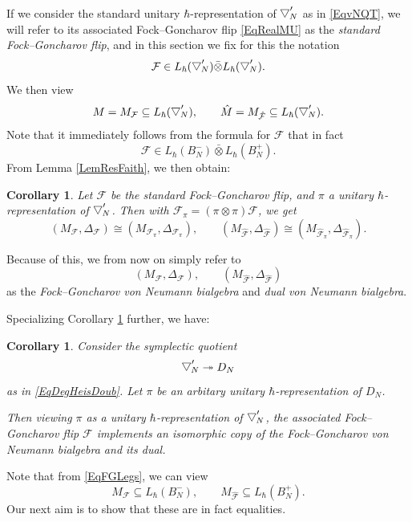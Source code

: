 \documentclass[11pt, reqno]{amsart}
\newtheorem{cor}[theorem]{Corollary}
\theoremstyle{definition}
\numberwithin{equation}{section}
\newcommand{\Fct}{\mathcal{F}}
\newcommand{\Bor}{B}
\newcommand{\wbtd}[1]{\raisebox{\depth}{$\bigtriangledown'$\!\!}_{#1}}
\begin{document}
If we consider the standard unitary $\hbar$-representation of $\wbtd{N}$ as in \eqref{EqvNQT}, we will refer to its associated Fock--Goncharov flip \eqref{EqRealMU} as the \emph{standard Fock--Goncharov flip}, and in this section we fix for this the notation 
\begin{equation}\label{EqStandardFG}
\Fct  \in L_{\hbar}(\wbtd{N}) \bar{\otimes} L_{\hbar}(\wbtd{N}).
\end{equation}
We then view 
\begin{equation}\label{EqvNFG}
M  = M_{\Fct} \subseteq L_{\hbar}(\wbtd{N}),\qquad \hat{M} = M_{\hat{\Fct}} \subseteq L_{\hbar}(\wbtd{N}).
\end{equation}
Note that it immediately follows from the formula for $\Fct$ that in fact 
\begin{equation}\label{EqFGLegs}
\Fct \in L_{\hbar}(\Bor_N^-)\bar{\otimes} L_{\hbar}(\Bor_N^+). 
\end{equation}
From Lemma \ref{LemResFaith}, we then obtain:


\begin{cor}\label{CorUnitRepArb}
Let $\Fct$ be the standard Fock--Goncharov flip, and $\pi$ a unitary $\hbar$-representation of $\wbtd{N}$. Then with $\Fct_{\pi} = (\pi\otimes \pi)\Fct$, we get
\[
(M_{\Fct},\Delta_{\Fct}) \cong (M_{\Fct_{\pi}},\Delta_{\Fct_{\pi}}),\qquad (M_{\hat{\Fct}},\Delta_{\hat{\Fct}}) \cong (M_{\hat{\Fct}_{\pi}},\Delta_{\hat{\Fct}_{\pi}}).
\]
\end{cor} 

Because of this, we from now on simply refer to 
\[
(M_{\Fct},\Delta_{\Fct}),\qquad (M_{\hat{\Fct}},\Delta_{\hat{\Fct}})
\]
as the \emph{Fock--Goncharov von Neumann bialgebra} and \emph{dual von Neumann bialgebra}.


Specializing Corollary \ref{CorUnitRepArb} further, we have: 
\begin{cor}\label{CorIrrMap}
Consider the symplectic quotient 
\[
\wbtd{N}\twoheadrightarrow D_N
\]
as in \eqref{EqDegHeisDoub}. Let $\pi$ be an arbitary unitary $\hbar$-representation of $D_N$. 

Then viewing $\pi$ as a unitary $\hbar$-representation of $\wbtd{N}$, the associated Fock--Goncharov flip $\Fct$ implements an isomorphic copy of the Fock--Goncharov von Neumann bialgebra and its dual.
\end{cor}

Note that from \eqref{EqFGLegs}, we can view 
\[
M_{\Fct} \subseteq L_{\hbar}(\Bor_N^-),\qquad M_{\hat{\Fct}} \subseteq L_{\hbar}(\Bor_N^+).
\]
Our next aim is to show that these are in fact equalities.
\end{document}
